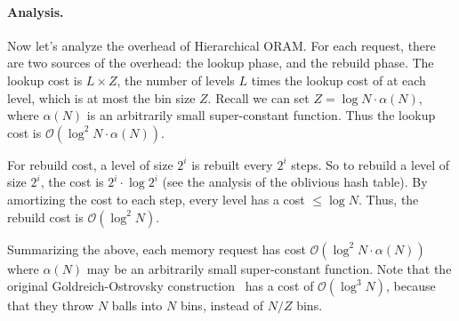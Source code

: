 \paragraph{Analysis.} Now let's analyze the overhead of Hierarchical ORAM. 
For each request, 
there are two sources of the overhead: the lookup phase, and the rebuild phase.
The lookup cost is $L \times Z$, the number of levels $L$ times the lookup cost of at each level, which is at most the bin size $Z$.
 Recall we can set $Z = \log N \cdot \alpha(N)$, where $\alpha(N)$ is 
an arbitrarily small super-constant function. 
Thus the lookup cost is $\mathcal{O}(\log^2 N \cdot \alpha(N))$.

For rebuild cost, a level of size $2^i$ is rebuilt every $2^i$ steps.
So to rebuild a level of size $2^i$, the cost is $2^i \cdot \log 2^i$ (see the analysis of the oblivious hash table).
By amortizing the cost to each step, every level has a cost $\leq \log N$.
Thus, the rebuild cost is $\mathcal{O}(\log^2 N)$.

Summarizing the above, each memory request
has cost $\mathcal{O}(\log^2 N \cdot \alpha(N))$ where $\alpha(N)$
may be an arbitrarily small super-constant function.
Note that the original Goldreich-Ostrovsky construction~\cite{10.1145/233551.233553} has a cost of $\mathcal{O}(\log^3 N)$, because that they throw $N$ balls into $N$ bins, instead of $N/Z$ bins.
